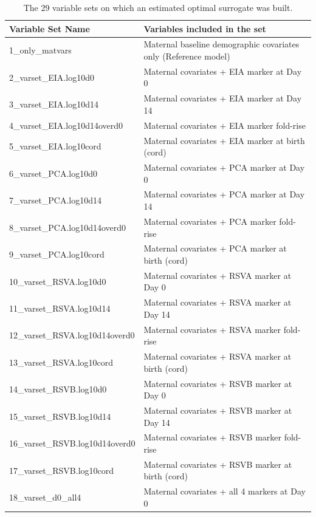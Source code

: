 \documentclass[11pt]{article}
\begin{document}
\begin{table}[!h]

\caption{\label{tab:varsets}The 29 variable sets on which an estimated optimal surrogate was built.}
\centering
\fontsize{9}{11}\selectfont
\begin{threeparttable}
\begin{tabular}[t]{l>{\raggedright\arraybackslash}p{15cm}}
\toprule
\textbf{Variable Set Name} & \textbf{Variables included in the set}\\
\midrule
1\_only\_matvars & Maternal baseline demographic covariates only (Reference model)\\
2\_varset\_EIA.log10d0 & Maternal covariates + EIA marker at Day 0\\
3\_varset\_EIA.log10d14 & Maternal covariates + EIA marker at Day 14\\
4\_varset\_EIA.log10d14overd0 & Maternal covariates + EIA marker fold-rise\\
5\_varset\_EIA.log10cord & Maternal covariates + EIA marker at birth (cord)\\
6\_varset\_PCA.log10d0 & Maternal covariates + PCA marker at Day 0\\
7\_varset\_PCA.log10d14 & Maternal covariates + PCA marker at Day 14\\
8\_varset\_PCA.log10d14overd0 & Maternal covariates + PCA marker fold-rise\\
9\_varset\_PCA.log10cord & Maternal covariates + PCA marker at birth (cord)\\
10\_varset\_RSVA.log10d0 & Maternal covariates + RSVA marker at Day 0\\
11\_varset\_RSVA.log10d14 & Maternal covariates + RSVA marker at Day 14\\
12\_varset\_RSVA.log10d14overd0 & Maternal covariates + RSVA marker fold-rise\\
13\_varset\_RSVA.log10cord & Maternal covariates + RSVA marker at birth (cord)\\
14\_varset\_RSVB.log10d0 & Maternal covariates + RSVB marker at Day 0\\
15\_varset\_RSVB.log10d14 & Maternal covariates + RSVB marker at Day 14\\
16\_varset\_RSVB.log10d14overd0 & Maternal covariates + RSVB marker fold-rise\\
17\_varset\_RSVB.log10cord & Maternal covariates + RSVB marker at birth (cord)\\
18\_varset\_d0\_all4 & Maternal covariates + all 4 markers at Day 0\\

\end{tabular}
\end{threeparttable}
\end{table}
\end{document}
